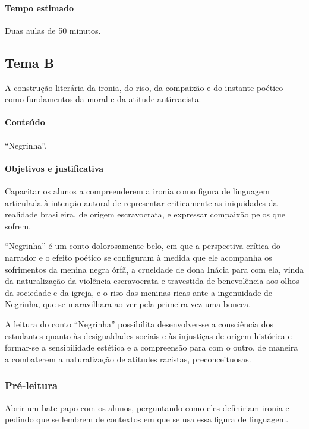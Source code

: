 \documentclass[12pt]{extarticle}
\begin{document}
\paragraph{Tempo estimado} Duas aulas de 50 minutos.

\subsection{Tema B}

A construção literária da ironia, do riso, da compaixão e do instante
poético como fundamentos da moral e da atitude antirracista.

\paragraph{Conteúdo} ``Negrinha''.

\paragraph{Objetivos e justificativa}
Capacitar os alunos a compreenderem a ironia como figura de linguagem
articulada à intenção autoral de representar criticamente as iniquidades
da realidade brasileira, de origem escravocrata, e expressar compaixão
pelos que sofrem.

``Negrinha'' é um conto dolorosamente belo, em que a perspectiva crítica
do narrador e o efeito poético se configuram à medida que ele acompanha
os sofrimentos da menina negra órfã, a crueldade de dona Inácia para com
ela, vinda da naturalização da violência escravocrata e travestida de
benevolência aos olhos da sociedade e da igreja, e o riso das meninas
ricas ante a ingenuidade de Negrinha, que se maravilhara ao ver pela
primeira vez uma boneca.

A leitura do conto ``Negrinha'' possibilita desenvolver-se a consciência
dos estudantes quanto às desigualdades sociais e às injustiças de origem
histórica e formar-se a sensibilidade estética e a compreensão para com
o outro, de maneira a combaterem a naturalização de atitudes racistas,
preconceituosas.

\subsubsection{Pré-leitura}

Abrir um bate-papo com os alunos, perguntando como eles definiriam
ironia e pedindo que se lembrem de contextos em que se usa essa figura
de linguagem.
\end{document}
